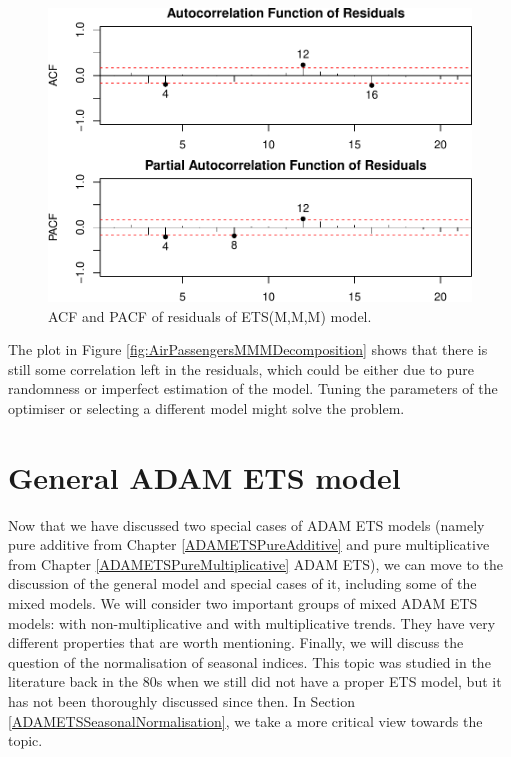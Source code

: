 \documentclass[]{book}
\theoremstyle{definition}
\theoremstyle{definition}
\theoremstyle{definition}
\theoremstyle{definition}
\theoremstyle{remark}
\begin{document}
\begin{figure}
\centering
\includegraphics{Svetunkov--2022----ADAM_files/figure-latex/AirPassengersMMMACFPACF-1.pdf}
\caption{\label{fig:AirPassengersMMMACFPACF}ACF and PACF of residuals of ETS(M,M,M) model.}
\end{figure}

The plot in Figure \ref{fig:AirPassengersMMMDecomposition} shows that there is still some correlation left in the residuals, which could be either due to pure randomness or imperfect estimation of the model. Tuning the parameters of the optimiser or selecting a different model might solve the problem.

\hypertarget{ADAMETSOther}{%
\chapter{General ADAM ETS model}\label{ADAMETSOther}}

Now that we have discussed two special cases of ADAM ETS models (namely pure additive from Chapter \ref{ADAMETSPureAdditive} and pure multiplicative from Chapter \ref{ADAMETSPureMultiplicative} ADAM ETS), we can move to the discussion of the general model and special cases of it, including some of the mixed models. We will consider two important groups of mixed ADAM ETS models: with non-multiplicative and with multiplicative trends. They have very different properties that are worth mentioning. Finally, we will discuss the question of the normalisation of seasonal indices. This topic was studied in the literature back in the 80s when we still did not have a proper ETS model, but it has not been thoroughly discussed since then. In Section \ref{ADAMETSSeasonalNormalisation}, we take a more critical view towards the topic.
\end{document}
